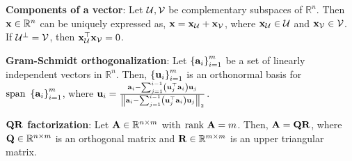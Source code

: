 \documentclass[letterpaper, twocolumn, 11pt]{article}
\let\mc\mathcal
\newcommand{\R}{\mathbb{R}}	%
\newcommand{\1}{\mathds{1}}	%
\theoremstyle{definition}
\def\mf{\ensuremath\mathbf}
\def\mc{\ensuremath\mathcal}
\def\lp{\ensuremath\left(}
\def\rp{\ensuremath\right)}
\def\lV{\ensuremath\left\lVert}
\def\rV{\ensuremath\right\rVert}
\def\lc{\ensuremath\left\{}
\def\rc{\ensuremath\right\}}
\begin{document}
\textbf{Components of a vector}: Let $\mc{U}, \mc{V}$ be complementary subspaces of $\R^n$. Then $\mf{x} \in \R^n$ can be uniquely expressed as, $\mf{x} = \mf{x}_{\mc{U}} + \mf{x}_{\mc{V}}$, where $\mf{x}_{\mc{U}} \in \mc{U}$ and $\mf{x}_{\mc{V}} \in \mc{V}$. If $\mc{U}^\perp = \mc{V}$, then $\mf{x}_{\mc{U}}^\top \mf{x}_{\mc{V}} = 0$.

\textbf{Gram-Schmidt orthogonalization}: Let $\lc \mf{a}_i \rc_{i=1}^{m}$ be a set of linearly independent vectors in $\R^n$. Then, $\lc \mf{u}_i \rc_{i=1}^{m}$ is an orthonormal basis for $\text{span }\lc \mf{a}_i \rc_{i=1}^{m}$, where $\mf{u}_i = \frac{\mf{a}_i - \sum_{j=1}^{i-1} \lp \mf{u}_j^\top\mf{a}_i \rp \mf{u}_j}{\lV \mf{a}_i - \sum_{j=1}^{i-1} \lp \mf{u}_j^\top\mf{a}_i \rp \mf{u}_j \rV_2}$.

\textbf{$\mf{Q}\mf{R}$ factorization}: Let $\mf{A} \in \R^{n \times m}$ with $\text{rank }\mf{A} = m$. Then, $\mf{A} = \mf{Q}\mf{R}$, where $\mf{Q} \in \R^{n \times m}$ is an orthogonal matrix and $\mf{R} \in \R^{m \times m}$ is an upper triangular matrix.

\end{document}
